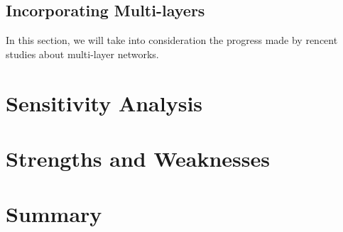 \documentclass[tcn = 37075, sheet = true, abstract = true]{mcmthesis}
\begin{document}
\subsection{Incorporating Multi-layers}
In this section, we will take into consideration the progress made by rencent studies about multi-layer networks. 



\section{Sensitivity Analysis}


\section{Strengths and Weaknesses}

\section{Summary}


\end{document}
